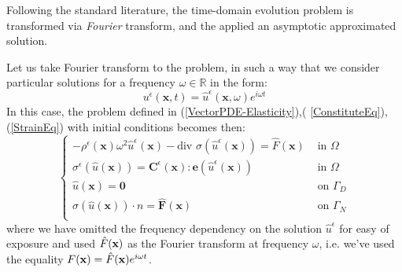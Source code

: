 Following the standard literature, the time-domain evolution problem is transformed via \textit{Fourier} transform, and the applied an asymptotic approximated solution.

Let us take Fourier transform to the problem, in such a way that we consider particular solutions for a frequency $\omega \in \mathbb{R}$ in the form:
\begin{equation}
    \label{FreqAnsatz}
    u^{\epsilon}(\mathbf{x},t) = \hat{u}^{\epsilon}(\mathbf{x},\omega) e^{i \omega t}
\end{equation}
In this case, the problem defined in (\ref{VectorPDE-Elasticity}),( \ref{ConstituteEq}), (\ref{StrainEq}) with initial conditions becomes then:
\begin{equation}
    \label{VectorPDE-Freq}
    \left \{
    \begin{array}{cc}
        -\rho^{\epsilon} (\mathbf{x}) \omega^2 \hat{u}^{\epsilon}(\mathbf{x}) - \text{div }\sigma (\hat{u}^{\epsilon}(\mathbf{x})) = \hat{F}(\mathbf{x})  & \text{ in }  \Omega \\
        \sigma^{\epsilon} (\hat{u}(\mathbf{x})) = \mathbf{C}^{\epsilon}(\mathbf{x}): \mathbf{e} (\hat{u}^{\epsilon}(\mathbf{x})) & \text{ in } \Omega  \\
        \hat{u}(\mathbf{x}) = \mathbf{0} & \text{ on } \Gamma_D\\
        \sigma (\hat{u}(\mathbf{x}))\cdot n = \hat{\mathbf{F}}(\mathbf{x}) & \text{ on } \Gamma_N \\
    \end{array}
    \right .
\end{equation}
where we have omitted the frequency dependency on the solution $\hat{u}^{\epsilon}$ for easy of exposure and used $\Hat{F}(\mathbf{x})$ as the Fourier transform at frequency $\omega$, i.e. we've used the equality $F(\mathbf{x}) = \Hat{F}(\mathbf{x})e^{i \omega t}$.

